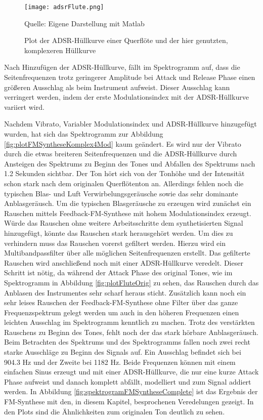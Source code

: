 \begin{figure} [ht]
\centering
  \texttt{[image: adsrFlute.png]}
\caption{Plot der ADSR-Hüllkurve einer Querflöte und der hier genutzten, komplexeren Hüllkurve}
\label{fig:adsrFlute}
Quelle: Eigene Darstellung mit Matlab
\end{figure}

Nach Hinzufügen der ADSR-Hüllkurve, fällt im Spektrogramm auf, dass die Seitenfrequenzen trotz geringerer Amplitude bei Attack und Release Phase einen größeren Ausschlag als beim Instrument aufweist. Dieser Ausschlag kann verringert werden, indem der erste Modulationsindex mit der ADSR-Hüllkurve variiert wird. 

Nachdem Vibrato, Variabler Modulationsindex und ADSR-Hüllkurve hinzugefügt wurden, hat sich das Spektrogramm zur Abbildung \ref{fig:plotFMSyntheseKomplex4Mod} kaum geändert. Es wird nur der Vibrato durch die etwas breiteren Seitenfrequenzen und die ADSR-Hüllkurve durch Ansteigen des Spektrums zu Beginn des Tones und Abfallen des Spektrums nach 1.2 Sekunden sichtbar. Der Ton hört sich von der Tonhöhe und der Intensität schon stark nach dem originalen Querflötenton an. Allerdings fehlen noch die typischen Blas- und Luft Verwirbelungsgeräusche sowie das sehr dominante Anblasgeräusch. Um die typischen Blasgeräusche zu erzeugen wird zunächst ein Rauschen mittels Feedback-FM-Synthese mit hohem Modulationsindex erzeugt. Würde das Rauschen ohne weitere Arbeitsschritte dem synthetisierten Signal hinzugefügt, könnte das Rauschen stark herausgehört werden. Um dies zu verhindern muss das Rauschen vorerst gefiltert werden. Hierzu wird ein Multibandpassfilter über alle möglichen Seitenfrequenzen erstellt. Das gefilterte Rauschen wird anschließend noch mit einer ADSR-Hüllkurve veredelt. Dieser Schritt ist nötig, da während der Attack Phase des original Tones, wie im Spektrogramm in Abbildung \ref{fig:plotFluteOrig} zu sehen, das Rauschen durch das Anblasen des Instrumentes sehr scharf heraus sticht. Zusätzlich kann noch ein sehr leises Rauschen der Feedback-FM-Synthese ohne Filter über das ganze Frequenzspektrum gelegt werden um auch in den höheren Frequenzen einen leichten Ausschlag im Spektrogramm kenntlich zu machen. Trotz des verstärkten Rauschens zu Beginn des Tones, fehlt noch der das stark hörbare Anblasgeräusch. Beim Betrachten des Spektrums und des Spektrogramms fallen noch zwei recht starke Ausschläge zu Beginn des Signals auf. Ein Ausschlag befindet sich bei 904.3 Hz und der Zweite bei 1182 Hz. Beide Frequenzen können mit einem einfachen Sinus erzeugt und mit einer ADSR-Hüllkurve, die nur eine kurze Attack Phase aufweist und danach komplett abfällt, modelliert und zum Signal addiert werden. In Abbildung \ref{fig:spektrogramFMSyntheseComplete} ist das Ergebnis der FM-Synthese mit den, in diesem Kapitel, besprochenen Veredelungen gezeigt. In den Plots sind die Ähnlichkeiten zum originalen Ton deutlich zu sehen.

